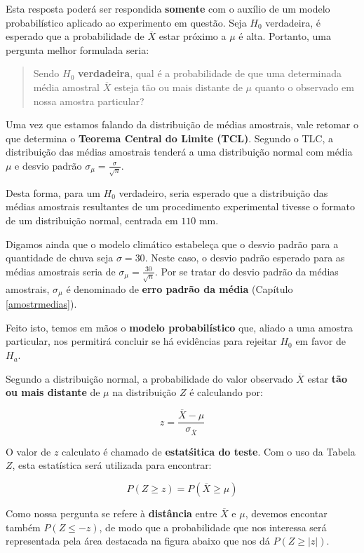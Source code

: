 \documentclass[
]{book}
\begin{document}
Esta resposta poderá ser respondida \textbf{somente} com o auxílio de um modelo probabilístico aplicado ao experimento em questão. Seja \(H_0\) verdadeira, é esperado que a probabilidade de \(\overline{X}\) estar próximo a \(\mu\) é alta. Portanto, uma pergunta melhor formulada seria:

\begin{quote}
Sendo \(H_0\) \textbf{verdadeira}, qual é a probabilidade de que uma determinada média amostral \(\overline{X}\) esteja tão ou mais distante de \(\mu\) quanto o observado em nossa amostra particular?
\end{quote}

Uma vez que estamos falando da distribuição de médias amostrais, vale retomar o que determina o \textbf{Teorema Central do Limite (TCL)}. Segundo o TLC, a distribuição das médias amostrais tenderá a uma distribuição normal com média \(\mu\) e desvio padrão \(\sigma_{\mu} = \frac{\sigma}{\sqrt{n}}\).

Desta forma, para um \(H_0\) verdadeiro, seria esperado que a distribuição das médias amostrais resultantes de um procedimento experimental tivesse o formato de um distribuição normal, centrada em \(110\) mm.

Digamos ainda que o modelo climático estabeleça que o desvio padrão para a quantidade de chuva seja \(\sigma = 30\). Neste caso, o desvio padrão esperado para as médias amostrais seria de \(\sigma_{\mu} = \frac{30}{\sqrt{n}}\). Por se tratar do desvio padrão da médias amostrais, \(\sigma_{\mu}\) é denominado de \textbf{erro padrão da média} (Capítulo \ref{amostrmedias}).

Feito isto, temos em mãos o \textbf{modelo probabilístico} que, aliado a uma amostra particular, nos permitirá concluir se há evidências para rejeitar \(H_0\) em favor de \(H_a\).

Segundo a distribuição normal, a probabilidade do valor observado \(\overline{X}\) estar \textbf{tão ou mais distante} de \(\mu\) na distribuição \(Z\) é calculando por:

\[z = \frac{\overline{X} - \mu}{\sigma_{\overline{X}}}\]

O valor de \(z\) calculato é chamado de \textbf{estatśitica do teste}. Com o uso da Tabela \(Z\), esta estatística será utilizada para encontrar:

\[P(Z \ge z) = P(\overline{X} \ge \mu)\]

Como nossa pergunta se refere à \textbf{distância} entre \(\overline{X}\) e \(\mu\), devemos encontar também \(P(Z \le -z)\), de modo que a probabilidade que nos interessa será representada pela área destacada na figura abaixo que nos dá \(P(Z \ge |z|)\).
\end{document}
